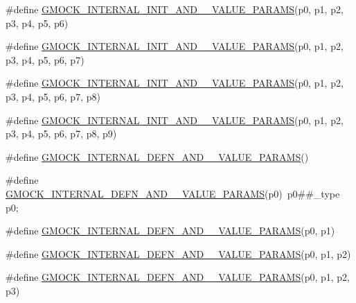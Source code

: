 \begin{DoxyCompactItemize}
\item 
\#define \mbox{\hyperlink{gmock-generated-actions_8h_aa1ba027eec9b36d5e710bfe9da99d443}{G\+M\+O\+C\+K\+\_\+\+I\+N\+T\+E\+R\+N\+A\+L\+\_\+\+I\+N\+I\+T\+\_\+\+A\+N\+D\+\_\+\_\+\+V\+A\+L\+U\+E\+\_\+\+P\+A\+R\+A\+MS}}(p0,  p1,  p2,  p3,  p4,  p5,  p6)
\item 
\#define \mbox{\hyperlink{gmock-generated-actions_8h_a12a0e970438c008214093b98b8eefa68}{G\+M\+O\+C\+K\+\_\+\+I\+N\+T\+E\+R\+N\+A\+L\+\_\+\+I\+N\+I\+T\+\_\+\+A\+N\+D\+\_\+\_\+\+V\+A\+L\+U\+E\+\_\+\+P\+A\+R\+A\+MS}}(p0,  p1,  p2,  p3,  p4,  p5,  p6,  p7)
\item 
\#define \mbox{\hyperlink{gmock-generated-actions_8h_aa69890581b384540649239847bd7dcbf}{G\+M\+O\+C\+K\+\_\+\+I\+N\+T\+E\+R\+N\+A\+L\+\_\+\+I\+N\+I\+T\+\_\+\+A\+N\+D\+\_\+\_\+\+V\+A\+L\+U\+E\+\_\+\+P\+A\+R\+A\+MS}}(p0,  p1,  p2,  p3,  p4,  p5,  p6,  p7,  p8)
\item 
\#define \mbox{\hyperlink{gmock-generated-actions_8h_aeed917d405a99878e11d53b8eca2b744}{G\+M\+O\+C\+K\+\_\+\+I\+N\+T\+E\+R\+N\+A\+L\+\_\+\+I\+N\+I\+T\+\_\+\+A\+N\+D\+\_\+\_\+\+V\+A\+L\+U\+E\+\_\+\+P\+A\+R\+A\+MS}}(p0,  p1,  p2,  p3,  p4,  p5,  p6,  p7,  p8,  p9)
\item 
\#define \mbox{\hyperlink{gmock-generated-actions_8h_a3fef729577c726683358d924c3d31c18}{G\+M\+O\+C\+K\+\_\+\+I\+N\+T\+E\+R\+N\+A\+L\+\_\+\+D\+E\+F\+N\+\_\+\+A\+N\+D\+\_\+\_\+\+V\+A\+L\+U\+E\+\_\+\+P\+A\+R\+A\+MS}}()
\item 
\#define \mbox{\hyperlink{gmock-generated-actions_8h_a9a2a07e6eff8e4ca6d45b8f7ea11cf3b}{G\+M\+O\+C\+K\+\_\+\+I\+N\+T\+E\+R\+N\+A\+L\+\_\+\+D\+E\+F\+N\+\_\+\+A\+N\+D\+\_\+\_\+\+V\+A\+L\+U\+E\+\_\+\+P\+A\+R\+A\+MS}}(p0)~p0\#\#\+\_\+type p0;
\item 
\#define \mbox{\hyperlink{gmock-generated-actions_8h_a16aa4a04e77951b00534396170438deb}{G\+M\+O\+C\+K\+\_\+\+I\+N\+T\+E\+R\+N\+A\+L\+\_\+\+D\+E\+F\+N\+\_\+\+A\+N\+D\+\_\+\_\+\+V\+A\+L\+U\+E\+\_\+\+P\+A\+R\+A\+MS}}(p0,  p1)
\item 
\#define \mbox{\hyperlink{gmock-generated-actions_8h_a584f78b5777db084208f151d7e4d51b7}{G\+M\+O\+C\+K\+\_\+\+I\+N\+T\+E\+R\+N\+A\+L\+\_\+\+D\+E\+F\+N\+\_\+\+A\+N\+D\+\_\+\_\+\+V\+A\+L\+U\+E\+\_\+\+P\+A\+R\+A\+MS}}(p0,  p1,  p2)
\item 
\#define \mbox{\hyperlink{gmock-generated-actions_8h_a1c04daeff7ae92839f33727e264f227f}{G\+M\+O\+C\+K\+\_\+\+I\+N\+T\+E\+R\+N\+A\+L\+\_\+\+D\+E\+F\+N\+\_\+\+A\+N\+D\+\_\+\_\+\+V\+A\+L\+U\+E\+\_\+\+P\+A\+R\+A\+MS}}(p0,  p1,  p2,  p3)

\end{DoxyCompactItemize}
